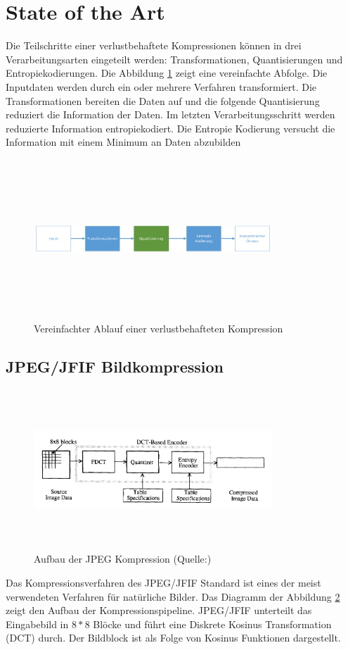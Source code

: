 \section{State of the Art}
Die Teilschritte einer verlustbehaftete Kompressionen können in drei Verarbeitungsarten eingeteilt werden: Transformationen, Quantisierungen und Entropiekodierungen. Die Abbildung \ref{state:aufbau} zeigt eine vereinfachte Abfolge. Die Inputdaten werden durch ein oder mehrere Verfahren transformiert. Die Transformationen bereiten die Daten auf und die folgende Quantisierung reduziert die Information der Daten. Im letzten Verarbeitungsschritt werden reduzierte Information entropiekodiert. Die Entropie Kodierung versucht die Information mit einem Minimum an Daten abzubilden\\
\begin{figure}[!htbp]
	\center
	\includegraphics[width=0.8\textwidth,height=6cm,keepaspectratio]{./pictures/state/aufbau.png}
	\caption{Vereinfachter Ablauf einer verlustbehafteten Kompression}
	\label{state:aufbau}
\end{figure}

\subsection{JPEG/JFIF Bildkompression}
\begin{figure}[!htbp]
	\center
	\includegraphics[width=0.8\textwidth,height=6cm,keepaspectratio]{./pictures/state/jpeg.png}
	\caption{Aufbau der JPEG Kompression (Quelle:\cite{wallace1992jpeg})}
	\label{state:jpeg:abb}
\end{figure}
Das Kompressionsverfahren des JPEG/JFIF Standard \cite{wallace1992jpeg} ist eines der meist verwendeten Verfahren für natürliche Bilder. Das Diagramm der Abbildung \ref{state:jpeg:abb} zeigt den Aufbau der Kompressionspipeline. JPEG/JFIF unterteilt das Eingabebild in $8*8$ Blöcke und führt eine Diskrete Kosinus Transformation (DCT) durch. Der Bildblock ist als Folge von Kosinus Funktionen dargestellt.

